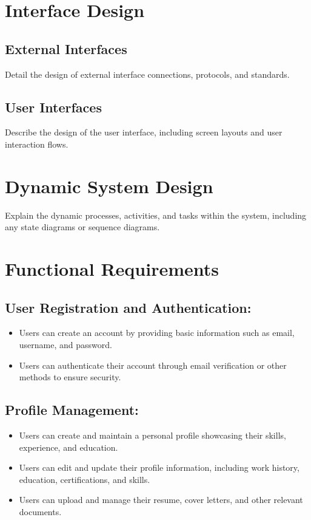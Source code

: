 \documentclass[titlepage]{article}
\begin{document}
\section{Interface Design}
\subsection{External Interfaces}
Detail the design of external interface connections, protocols, and standards.

\subsection{User Interfaces}
Describe the design of the user interface, including screen layouts and user interaction flows.

\section{Dynamic System Design}
Explain the dynamic processes, activities, and tasks within the system, including any state diagrams or sequence diagrams.

\section{Functional Requirements}
\subsection{User Registration and Authentication:}
\begin{itemize}
    \item Users can create an account by providing basic information such as email, username, and password.
    \item Users can authenticate their account through email verification or other methods to ensure security.
\end{itemize}
\subsection{Profile Management:}
\begin{itemize}
    \item Users can create and maintain a personal profile showcasing their skills, experience, and education.
    \item Users can edit and update their profile information, including work history, education, certifications, and skills.
    \item Users can upload and manage their resume, cover letters, and other relevant documents.
\end{itemize}
\end{document}
